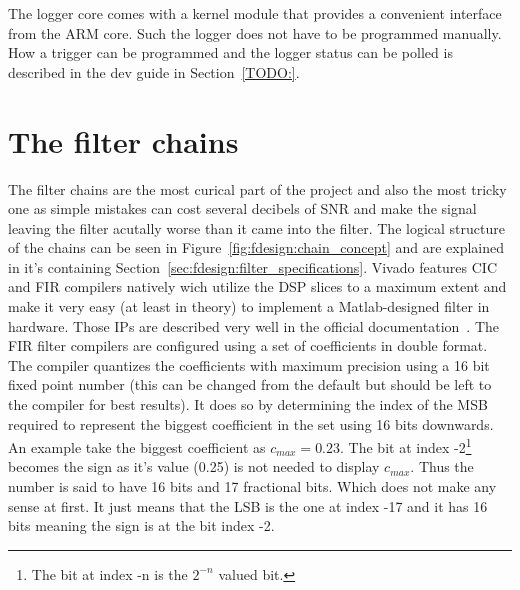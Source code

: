 The logger core comes with a kernel module that provides a convenient interface from the ARM core. Such the logger does not have to be programmed manually. How a trigger can be programmed and the logger status can be polled is described in the dev guide in Section~\ref{TODO:}.

\section{The filter chains}
\label{sec:fpga:chains}

The filter chains are the most curical part of the project and also the most tricky one as simple mistakes can cost several decibels of SNR and make the signal leaving the filter acutally worse than it came into the filter.
The logical structure of the chains can be seen in Figure~\ref{fig:fdesign:chain_concept} and are explained in it's containing Section~\ref{sec:fdesign:filter_specifications}.
Vivado features CIC and FIR compilers natively wich utilize the DSP slices to a maximum extent and make it very easy (at least in theory) to implement a Matlab-designed filter in hardware. Those IPs are described very well in the official documentation~\cite{TODO:}.
The FIR filter compilers are configured using a set of coefficients in double format. The compiler quantizes the coefficients with maximum precision using a 16 bit fixed point number (this can be changed from the default but should be left to the compiler for best results). It does so by determining the index of the MSB required to represent the biggest coefficient in the set using 16 bits downwards.
An example take the biggest coefficient as $c_{max} = 0.23$. The bit at index -2\footnote{The bit at index -n is the $2^{-n}$ valued bit.} becomes the sign as it's value (0.25) is not needed to display $c_{max}$. Thus the number is said to have 16 bits and 17 fractional bits. Which does not make any sense at first. It just means that the LSB is the one at index -17 and it has 16 bits meaning the sign is at the bit index -2.

